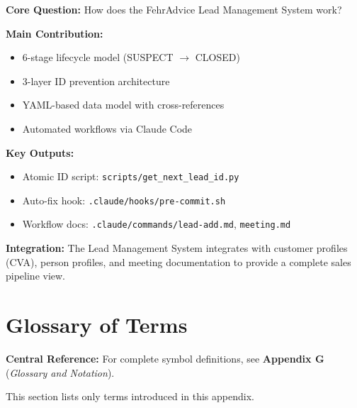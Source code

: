 \begin{tcolorbox}[colback=green!10!white, colframe=green!75!black,
    title=\textbf{Appendix BN: Summary}]

\textbf{Core Question:} How does the FehrAdvice Lead Management System work?

\textbf{Main Contribution:}
\begin{itemize}[nosep]
    \item 6-stage lifecycle model (SUSPECT $\to$ CLOSED)
    \item 3-layer ID prevention architecture
    \item YAML-based data model with cross-references
    \item Automated workflows via Claude Code
\end{itemize}

\textbf{Key Outputs:}
\begin{itemize}[nosep]
    \item Atomic ID script: \texttt{scripts/get\_next\_lead\_id.py}
    \item Auto-fix hook: \texttt{.claude/hooks/pre-commit.sh}
    \item Workflow docs: \texttt{.claude/commands/lead-add.md}, \texttt{meeting.md}
\end{itemize}

\textbf{Integration:} The Lead Management System integrates with customer profiles (CVA), person profiles, and meeting documentation to provide a complete sales pipeline view.

\end{tcolorbox}


\section{Glossary of Terms}
\label{sec:bn-glossary}

\begin{tcolorbox}[colback=blue!5!white, colframe=blue!75!black]
\textbf{Central Reference:} For complete symbol definitions, see
\textbf{Appendix G} (\textit{Glossary and Notation}).

This section lists only terms introduced in this appendix.
\end{tcolorbox}

\vspace{0.5em}

